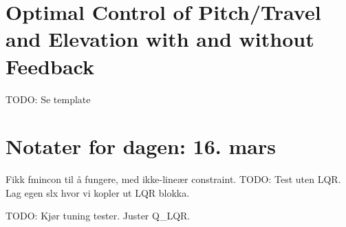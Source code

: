 \section{Optimal Control of Pitch/Travel and Elevation with and without Feedback}\label{sec:prob4}
TODO: Se template

\section{Notater for dagen: 16. mars}
Fikk fmincon til å fungere, med ikke-lineær constraint.
TODO: Test uten LQR. Lag egen slx hvor vi kopler ut LQR blokka.

TODO: Kjør tuning tester. Juster Q_LQR.

